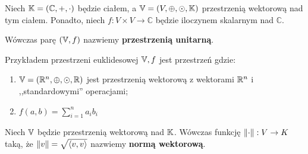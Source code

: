 \begin{definition}
	Niech \(\mathbb{K} = (\mathbb{C}, +, \cdot)\) będzie ciałem, a \(\mathbb{V} = (V, \oplus, \odot, \mathbb{K})\) przestrzenią wektorową nad tym ciałem. Ponadto, niech \(f: V \times V \rightarrow \mathbb{C}\) będzie iloczynem skalarnym nad \(\mathbb{C}\).

	Wówczas parę \((\mathbb{V}, f)\) nazwiemy \textbf{przestrzenią unitarną}.
\end{definition}

\begin{example}
	Przykładem przestrzeni euklidesowej \(\mathbb{V}, f\) jest przestrzeń gdzie:
	\begin{enumerate}
		\item \(\mathbb{V} = (\mathbb{R}^n, \oplus, \odot, \mathbb{R})\) jest przestrzenią wektorową z wektorami \(\mathbb{R}^n\) i ,,standardowymi'' operacjami;
		\item \(f(a, b) = \sum_{i=1}^{n} a_i b_i\)
	\end{enumerate}

\end{example}

\begin{definition}
	Niech \(\mathbb{V}\) będzie przestrzenią wektorową nad \(\mathbb{K}\). Wówczas funkcję \(\left\Vert \cdot \right\Vert: V \rightarrow K\) taką, że \(\left\Vert v \right\Vert = \sqrt{\langle v, v \rangle}\)
	nazwiemy \textbf{normą wektorową}.
\end{definition}